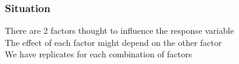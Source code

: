 \documentclass[color=usenames,dvipsnames]{beamer}\usepackage[]{graphicx}\usepackage[]{color}
\newcommand{\hlnum}[1]{\textcolor[rgb]{0.69,0.494,0}{#1}}%
\newcommand{\hlstr}[1]{\textcolor[rgb]{0.749,0.012,0.012}{#1}}%
\newcommand{\hlopt}[1]{\textcolor[rgb]{0,0,0}{#1}}%
\newcommand{\hlstd}[1]{\textcolor[rgb]{0,0,0}{#1}}%
\newcommand{\hlkwc}[1]{\textcolor[rgb]{0,0,0}{\textbf{#1}}}%
\newcommand{\hlkwd}[1]{\textcolor[rgb]{0.004,0.004,0.506}{#1}}%
\begin{document}
\begin{comment}
\end{alltt}
\begin{verbatim}
##             Df Sum Sq Mean Sq F value   Pr(>F)    
## precip       1   44.1    44.1   9.303  0.00387 ** 
## temp         1  736.3   736.3 155.389 4.92e-16 ***
## precip:temp  1  352.1   352.1  74.301 5.29e-11 ***
## Residuals   44  208.5     4.7                     
## ---
## Signif. codes:  0 '***' 0.001 '**' 0.01 '*' 0.05 '.' 0.1 ' ' 1
\end{verbatim}
\begin{alltt}
\hlkwd{summary}\hlstd{(}\hlkwd{aov}\hlstd{(species} \hlopt{~} \hlstd{precip}\hlopt{+}\hlstd{temp, richness))}
\end{alltt}
\begin{verbatim}
##             Df Sum Sq Mean Sq F value   Pr(>F)    
## precip       1   44.1    44.1   3.539   0.0664 .  
## temp         1  736.3   736.3  59.108 9.84e-10 ***
## Residuals   45  560.6    12.5                     
## ---
## Signif. codes:  0 '***' 0.001 '**' 0.01 '*' 0.05 '.' 0.1 ' ' 1
\end{verbatim}
\begin{alltt}
\hlkwd{write.csv}\hlstd{(richness,} \hlstr{"speciesRichness.csv"}\hlstd{,} \hlkwc{row.names}\hlstd{=}\hlnum{FALSE}\hlstd{)}
\end{alltt}
\end{kframe}
\end{knitrout}
\end{frame}
\end{comment}



\begin{frame}
  \frametitle{Situation}
  There are 2 factors thought to influence the response variable \\
  \pause
  \vfill
  The effect of each factor might depend on the other factor \\
  \pause
  \vfill
  We have replicates for each \alert{combination} of factors \\
\end{frame}


\end{document}
